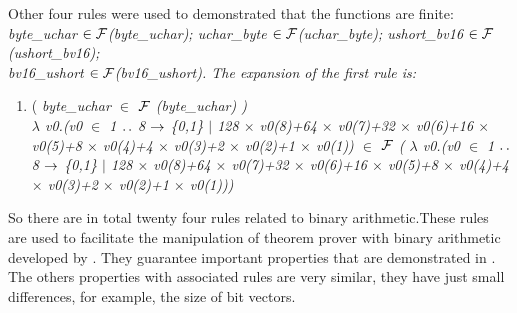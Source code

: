 Other four rules were used to demonstrated that the functions are finite: \it byte\_uchar  $ \in \mbox{${\cal F}$}$\rm (\it byte\_uchar\rm ); \it uchar\_byte  $ \in \mbox{${\cal F}$}$\rm (\it uchar\_byte\rm ); \it ushort\_bv16 $ \in \mbox{${\cal F}$}$\rm (\it ushort\_bv16\rm );\\ \it bv16\_ushort $ \in \mbox{${\cal F}$}$\rm (\it bv16\_ushort\rm ). 
The expansion of the first rule is:
\begin{enumerate}
\item  (   \it byte\_uchar $\in$   $\mbox{${\cal F}$}$ \rm (\it byte\_uchar\rm ) )\\
 $\lambda$ \it v0\rm .\rm (\it v0 $\in$  \rm 1 $\mathbin{\ldotp\ldotp}$ \rm 8  $\rightarrow$  \rm \{\rm 0\rm ,\rm 1\rm \}  $\mid$  \rm 1\rm 2\rm 8 $\times$ \it v0\rm (\rm 8\rm )\rm +\rm 6\rm 4 $\times$ \it v0\rm (\rm 7\rm )\rm +\rm 3\rm 2 $\times$ \it v0\rm (\rm 6\rm )\rm +\rm 1\rm 6 $\times$ \it v0\rm (\rm 5\rm )\rm +\rm 8 $\times$ \it v0\rm (\rm 4\rm )\rm +\rm 4 $\times$ \it v0\rm (\rm 3\rm )\rm +\rm 2 $\times$ \it v0\rm (\rm 2\rm )\rm +\rm 1 $\times$ \it v0\rm (\rm 1\rm )\rm ) $\in$   $\mbox{${\cal F}$}$ \rm ( $\lambda$ \it v0\rm .\rm (\it v0 $\in$  \rm 1 $\mathbin{\ldotp\ldotp}$ \rm 8  $\rightarrow$  \rm \{\rm 0\rm ,\rm 1\rm \}  $\mid$  \rm 1\rm 2\rm 8 $\times$ \it v0\rm (\rm 8\rm )\rm +\rm 6\rm 4 $\times$ \it v0\rm (\rm 7\rm )\rm +\rm 3\rm 2 $\times$ \it v0\rm (\rm 6\rm )\rm +\rm 1\rm 6 $\times$ \it v0\rm (\rm 5\rm )\rm +\rm 8 $\times$ \it v0\rm (\rm 4\rm )\rm +\rm 4 $\times$ \it v0\rm (\rm 3\rm )\rm +\rm 2 $\times$ \it v0\rm (\rm 2\rm )\rm +\rm 1 $\times$ \it v0\rm (\rm 1\rm )\rm )\rm )  \\


\end{enumerate}


So there are in total twenty four rules related to binary arithmetic.These rules are used to facilitate the manipulation of theorem prover with binary arithmetic developed by \cite{Leibnizens}. They guarantee important properties that are demonstrated in \cite{James2010,Dasgupta2006}.
The others properties with associated rules are very similar, they have just small differences, for example, the size of bit vectors. 











